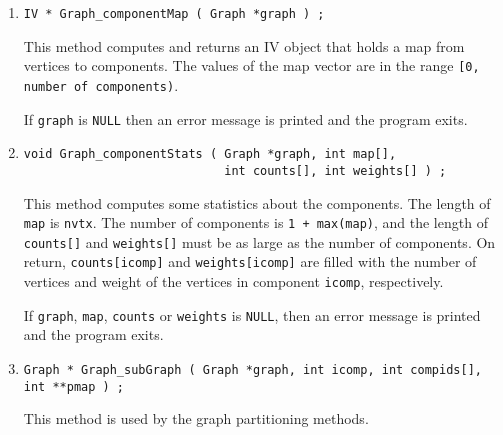 \begin{enumerate}
This method fills {\tt *psize} with the size of the adjacency
list, {\tt *puadj} points to the start of the list vector
and {\tt *puewghts} points to the start of the edge weights vector.
\par {}
If {\tt graph} is {\tt NULL},
or if {\tt u < 0} or {\tt u >= nvtx}
or if {\tt pusize}, {\tt puadj} or {\tt puewghts} is {\tt NULL},
an error message is printed and the program exits.
\item
\begin{verbatim}
IV * Graph_componentMap ( Graph *graph ) ;
\end{verbatim}
This method computes and returns an IV object that holds a
map from vertices to components.
The values of the map vector are in the range 
{\tt [0, number of components)}.
\par {}
If {\tt graph} is {\tt NULL} then 
an error message is printed and the program exits.
\item
\begin{verbatim}
void Graph_componentStats ( Graph *graph, int map[], 
                            int counts[], int weights[] ) ;
\end{verbatim}
This method computes some statistics about the components.
The length of {\tt map} is {\tt nvtx}.
The number of components is {\tt 1 + max(map)},
and the length of {\tt counts[]} and {\tt weights[]} must be as
large as the number of components.
On return, {\tt counts[icomp]} and {\tt weights[icomp]} are filled 
with the number of vertices and weight of the vertices in component 
{\tt icomp}, respectively.
\par {}
If {\tt graph}, {\tt map}, {\tt counts} or {\tt weights}
is {\tt NULL}, then 
an error message is printed and the program exits.
\item
\begin{verbatim}
Graph * Graph_subGraph ( Graph *graph, int icomp, int compids[], int **pmap ) ;
\end{verbatim}
This method is used by the graph partitioning methods.

\end{enumerate}
